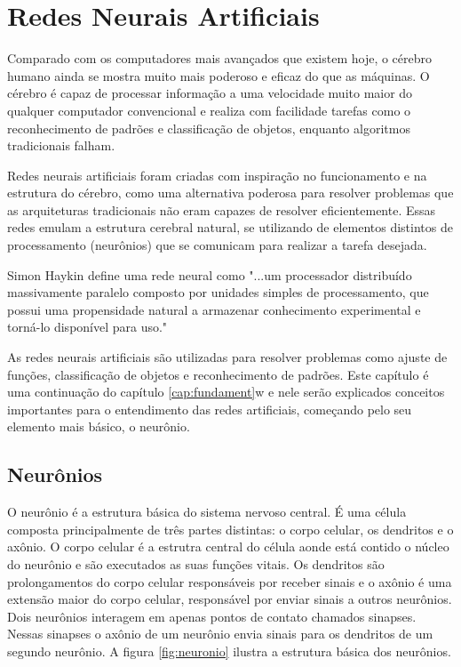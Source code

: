 \chapter{Redes Neurais Artificiais} \label{cap:redes}

Comparado com os computadores mais avançados que existem hoje, o cérebro humano ainda se mostra muito mais poderoso e eficaz do que as máquinas. O cérebro é capaz de processar informação a uma velocidade muito maior do qualquer computador convencional e realiza com facilidade tarefas como o reconhecimento de padrões e classificação de objetos, enquanto algoritmos tradicionais falham. 

Redes neurais artificiais foram criadas com inspiração no funcionamento e na estrutura do cérebro, como uma alternativa poderosa para resolver problemas que as arquiteturas tradicionais não eram capazes de resolver eficientemente. Essas redes emulam a estrutura cerebral natural, se utilizando de elementos distintos de processamento (neurônios) que se comunicam para realizar a tarefa desejada. 

Simon Haykin\cite{Haykin} define uma rede neural como "...um processador distribuído massivamente paralelo composto por unidades simples de processamento, que possui uma propensidade natural a armazenar conhecimento experimental e torná-lo disponível para uso."

As redes neurais artificiais são utilizadas para resolver problemas como ajuste de funções, classificação de objetos e reconhecimento de padrões. Este capítulo é uma continuação do capítulo \ref{cap:fundament}w e nele serão explicados conceitos importantes para o entendimento das redes artificiais, começando pelo seu elemento mais básico, o neurônio.

\section{Neurônios}

O neurônio é a estrutura básica do sistema nervoso central. É uma célula composta principalmente de três partes distintas: o corpo celular, os dendritos e o axônio. O corpo celular é a estrutra central do célula aonde está contido o núcleo do neurônio e são executados as suas funções vitais. Os dendritos são prolongamentos do corpo celular responsáveis por receber sinais e o axônio é uma extensão maior do corpo celular, responsável por enviar sinais a outros neurônios. Dois neurônios interagem em apenas  pontos de contato chamados sinapses. Nessas sinapses o axônio de um neurônio envia sinais para os dendritos de um segundo neurônio. A figura \ref{fig:neuronio} ilustra a estrutura básica dos neurônios.

